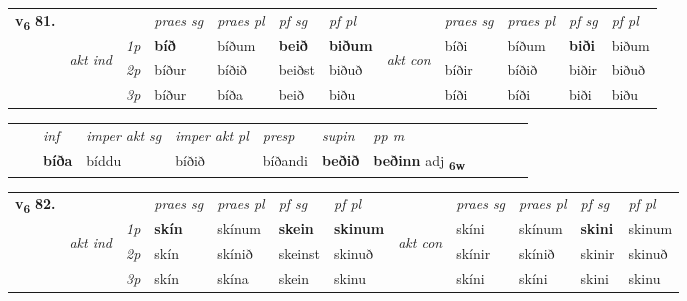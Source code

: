 \begin{tabular}{llllllllllll} \toprule
\multirow{4}{*}{{{\textbf{v{\textsubscript{6}}} \Large{\textbf{81.}}}}}  & &   &  \textit{praes sg}  & \textit{praes pl}  &\textit{ pf sg} & \textit{pf pl} &  &  \textit{praes sg}  & \textit{praes pl}  & \textit{pf sg} & \textit{pf pl } \\*
	\cmidrule{4-7} \cmidrule{9-12}
 & \multirow{3}{*}{\begin{turn}{90}\textit{akt ind}\end{turn}} & {\textit{1p}} & \textbf{bíð} & bíðum    & \textbf{beið} & \textbf{biðum} & \multirow{3}{*}{\begin{turn}{90}\textit{akt con}\end{turn}} &bíði & bíðum & \textbf{biði} & biðum\\*
& &  {\textit{2p}} &  bíður  & bíðið   & beiðst & biðuð & & bíðir & bíðið & biðir & biðuð \\*
& &  {\textit{3p}} & bíður & bíða   & beið & biðu & & bíði & bíði& biði & biðu  \\*
\cmidrule{4-7} \cmidrule{9-12}
\end{tabular}


\begin{tabular}{llllllllllll}
 & & \textit{inf} & \textit{imper akt sg} & \textit{imper akt pl}   & \textit{presp} & \textit{supin}  & \textit{pp m}     \\*
  & & \textbf{bíða} & bíddu  & bíðið   & bíðandi &  \textbf{beðið}  & \textbf{beðinn} adj \textbf{\textsubscript{6w}} \\*
\cmidrule{1-12}
\end{tabular}



\begin{tabular}{llllllllllll} \toprule
\multirow{4}{*}{{{\textbf{v{\textsubscript{6}}} \Large{\textbf{82.}}}}}  & &   &  \textit{praes sg}  & \textit{praes pl}  &\textit{ pf sg} & \textit{pf pl} &  &  \textit{praes sg}  & \textit{praes pl}  & \textit{pf sg} & \textit{pf pl } \\*
	\cmidrule{4-7} \cmidrule{9-12}
 & \multirow{3}{*}{\begin{turn}{90}\textit{akt ind}\end{turn}} & {\textit{1p}} & \textbf{skín} & skínum    & \textbf{skein} & \textbf{skinum} & \multirow{3}{*}{\begin{turn}{90}\textit{akt con}\end{turn}} &skíni & skínum & \textbf{skini} & skinum\\*
& &  {\textit{2p}} &  skín  & skínið   & skeinst & skinuð & & skínir & skínið & skinir & skinuð \\*
& &  {\textit{3p}} & skín & skína   & skein & skinu & & skíni & skíni& skini & skinu  \\*
\cmidrule{4-7} \cmidrule{9-12}
\end{tabular}


